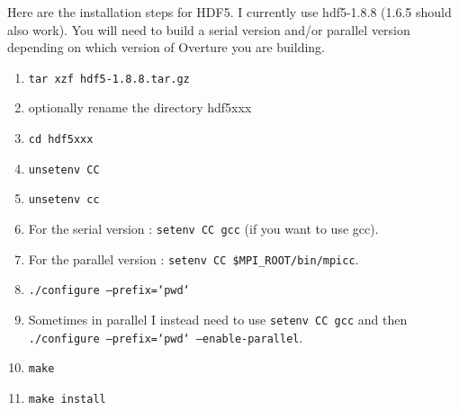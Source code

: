 \documentclass{article}
\newcommand{\software}{../software}
\begin{document}
Here are the installation steps for HDF5. I currently use hdf5-1.8.8 (1.6.5 should also work). You will need to build a 
serial version and/or parallel version depending on which version of Overture you are building.
\begin{enumerate}
  \item {\tt tar xzf hdf5-1.8.8.tar.gz}
  \item optionally rename the directory hdf5xxx
  \item {\tt cd hdf5xxx}
  \item {\tt unsetenv CC}
  \item {\tt unsetenv cc}
  \item For the serial version : {\tt setenv CC gcc} (if you want to use gcc).
  \item For the parallel version : {\tt setenv CC \$MPI\_ROOT/bin/mpicc}.  %
  \item {\tt ./configure --prefix=`pwd`}
  \item Sometimes in parallel I instead need to use {\tt setenv CC gcc} and then {\tt ./configure --prefix=`pwd` --enable-parallel}.
  \item {\tt make}
  \item {\tt make install}
\end{enumerate}



\end{document}
